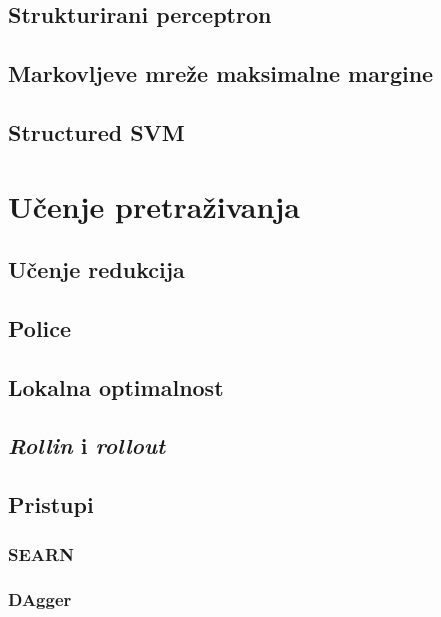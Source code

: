 \documentclass[times, utf8, diplomski]{fer}
\begin{document}
\section{Strukturirani perceptron}


\section{Markovljeve mreže maksimalne margine}

\section{Structured SVM}

\chapter{Učenje pretraživanja}


\section{Učenje redukcija}


\section{Police}


\section{Lokalna optimalnost}
\section{\emph{Rollin} i \emph{rollout}}


\section{Pristupi}
\subsection{SEARN}


\subsection{DAgger}
\end{document}
